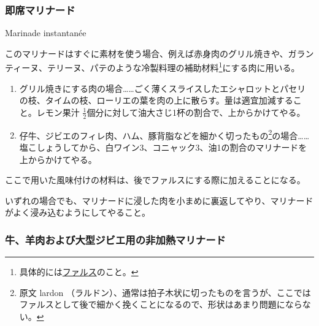 \begin{recette}

\hypertarget{marinade-instantanee}{%
\subsubsection{即席マリナード}\label{marinade-instantanee}}

\begin{frsubenv}

Marinade instantanée

\end{frsubenv}


このマリナードはすぐに素材を使う場合、例えば赤身肉のグリル焼きや、ガランティーヌ、テリーヌ、パテのような冷製料理の補助材料\footnote{具体的には\protect\hyperlink{farces}{ファルス}のこと。}にする肉に用いる。

\begin{enumerate}
\def\labelenumi{\arabic{enumi}.}
\item
  グリル焼きにする肉の場合\ldots{}\ldots{}ごく薄くスライスしたエシャロットとパセリの枝、タイムの枝、ローリエの葉を肉の上に散らす。量は適宜加減すること。レモン果汁
  \(\frac{1}{2}\)個分に対して油大さじ1杯の割合で、上からかけてやる。
\item
  仔牛、ジビエのフィレ肉、ハム、豚背脂などを細かく切ったもの\footnote{原文
    lardon
    （ラルドン）、通常は拍子木状に切ったものを言うが、ここではファルスとして後で細かく挽くことになるので、形状はあまり問題にならない。}の場合\ldots{}\ldots{}塩こしょうしてから、白ワイン3、コニャック3、油1の割合のマリナードを上からかけてやる。
\end{enumerate}

ここで用いた風味付けの材料は、後でファルスにする際に加えることになる。

いずれの場合でも、マリナードに浸した肉を小まめに裏返してやり、マリナードがよく浸み込むようにしてやること。

\atoaki{}

\hypertarget{marinade-crue-pour-viandes-de-boucherie-ou-venaison}{%
\subsubsection{牛、羊肉および大型ジビエ用の非加熱マリナード}\label{marinade-crue-pour-viandes-de-boucherie-ou-venaison}}

\begin{frsubenv}


\end{frsubenv}
\end{recette}
